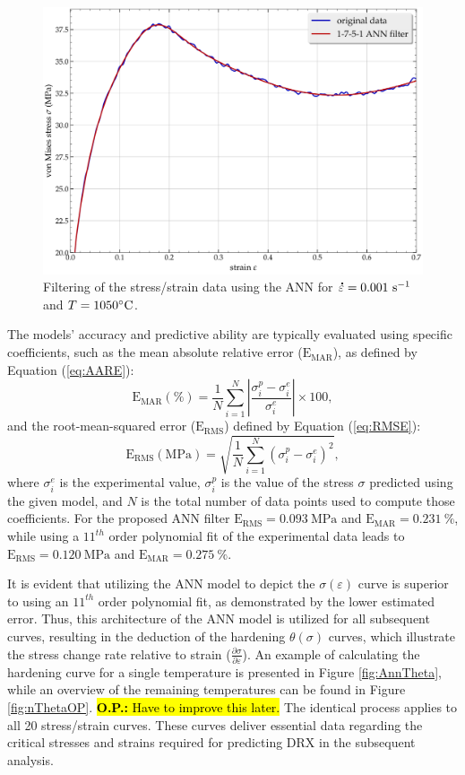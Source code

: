 \documentclass[metals,article,submit,pdftex,moreauthors]{Definitions/mdpi}
\DeclareRobustCommand{\mdot}[1]{\accentset{\mbox{\bfseries .}}{#1}}
\DeclareRobustCommand{\RMSE}{\text{E}_\text{RMS}}
\DeclareRobustCommand{\MARE}{\text{E}_\text{MAR}}
\DeclareRobustCommand{\ps}{\text{s}^{-1}}
\DeclareRobustCommand{\MPa}{\text{MPa}}
\DeclareRobustCommand{\OP}[1]{\begingroup\sethlcolor{VWyellow}\textcolor{red}{\hl{\textbf{O.P.:} #1}}\endgroup}
\begin{document}
\begin{figure}[H]
\centering
\includegraphics[width=0.7\columnwidth]{Figures/AnnFit}
\caption{Filtering of the stress/strain data using the ANN for $\mdot\varepsilon=0.001~\ps$ and $T=1050\celsius$.}
\label{fig:AnnFit}
\end{figure}
The models' accuracy and predictive ability are typically evaluated using specific coefficients, such as the mean absolute relative error ($\MARE$), as defined by Equation (\ref{eq:AARE}):
\begin{equation}
\MARE(\%) = \frac{1}{N} \sum_{i=1}^{N}{\left|\frac{\sigma_i^p -\sigma_i^e}{\sigma_i^e}\right|} \times 100, \label{eq:AARE}
\end{equation}
and the root-mean-squared error ($\RMSE$) defined by Equation (\ref{eq:RMSE}):
\begin{equation}
\RMSE (\MPa) = \sqrt{\frac{1}{N} \sum_{i=1}^{N} \left(\sigma_i^p - \sigma_i^e\right)^2}, \label{eq:RMSE}
\end{equation}
where $\sigma_i^e$ is the experimental value, $\sigma_i^p$ is the value of the stress $\sigma$ predicted using the given model, and $N$ is the total number of data points used to compute those coefficients.
For the proposed ANN filter $\RMSE=0.093~\MPa$ and $\MARE=0.231~\%$, while using a $11^{th}$ order polynomial fit of the experimental data leads to $\RMSE=0.120~\MPa$ and $\MARE=0.275~\%$.

It is evident that utilizing the ANN model to depict the $\sigma(\varepsilon)$ curve is superior to using an $11^{th}$ order polynomial fit, as demonstrated by the lower estimated error.
Thus, this architecture of the ANN model is utilized for all subsequent curves, resulting in the deduction of the hardening $\theta(\sigma)$ curves, which illustrate the stress change rate relative to strain ($\frac{\partial \sigma}{\partial \varepsilon}$).
An example of calculating the hardening curve for a single temperature is presented in Figure \ref{fig:AnnTheta}, while an overview of the remaining temperatures can be found in Figure \ref{fig:nThetaOP}. \OP{Have to improve this later.}
The identical process applies to all 20 stress/strain curves.
These curves deliver essential data regarding the critical stresses and strains required for predicting DRX in the subsequent analysis.
\end{document}
